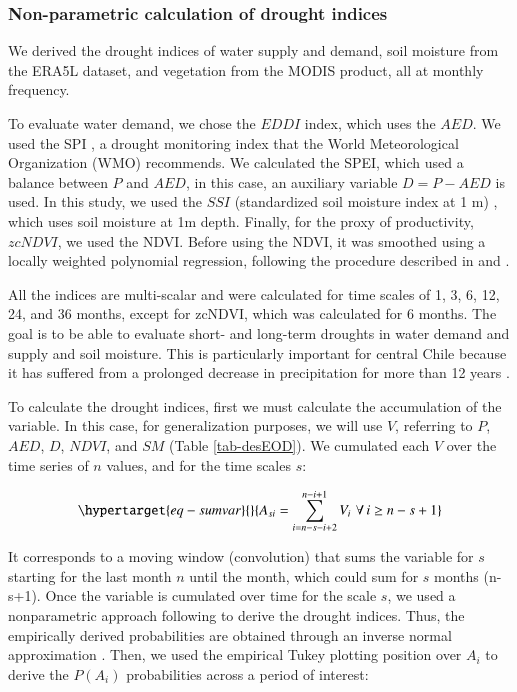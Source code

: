 \documentclass[
  authoryear,
  preprint,
  3p,
  onecolumn]{elsarticle}
\begin{document}
\hypertarget{non-parametric-calculation-of-drought-indices}{%
\subsubsection{Non-parametric calculation of drought
indices}\label{non-parametric-calculation-of-drought-indices}}

We derived the drought indices of water supply and demand, soil moisture
from the ERA5L dataset, and vegetation from the MODIS product, all at
monthly frequency.

To evaluate water demand, we chose the \(EDDI\)
\citep{Hobbins2016, McEvoy2016} index, which uses the \(AED\). We used
the SPI \citep{Mckee1993}, a drought monitoring index that the World
Meteorological Organization (WMO) recommends. We calculated the SPEI,
which used a balance between \(P\) and \(AED\), in this case, an
auxiliary variable \(D = P-AED\) is used. In this study, we used the
\(SSI\) (standardized soil moisture index at 1 m)
\citep{Hao2013, AghaKouchak2014}, which uses soil moisture at 1m depth.
Finally, for the proxy of productivity, \(zcNDVI\), we used the NDVI.
Before using the NDVI, it was smoothed using a locally weighted
polynomial regression, following the procedure described in
\citet{Zambrano2018} and \citet{Zambrano2016}.

All the indices are multi-scalar and were calculated for time scales of
1, 3, 6, 12, 24, and 36 months, except for zcNDVI, which was calculated
for 6 months. The goal is to be able to evaluate short- and long-term
droughts in water demand and supply and soil moisture. This is
particularly important for central Chile because it has suffered from a
prolonged decrease in precipitation for more than 12 years
\citep{Garreaud2020, Boisier2018, Garreaud2017}.

To calculate the drought indices, first we must calculate the
accumulation of the variable. In this case, for generalization purposes,
we will use \(V\), referring to \(P\), \(AED\), \(D\), \(NDVI\), and
\(SM\) (Table \ref{tab-desEOD}). We cumulated each \(V\) over the time
series of \(n\) values, and for the time scales \(s\):

\begin{equation}\protect\hypertarget{eq-sumvar}{}{A_{si} = \sum_{i=n-s-i+2}^{n-i+1} V_i\,\, \forall\, i\geq n-s+1  }\label{eq-sumvar}\end{equation}

It corresponds to a moving window (convolution) that sums the variable
for \(s\) starting for the last month \(n\) until the month, which could
sum for \(s\) months (n-s+1). Once the variable is cumulated over time
for the scale \(s\), we used a nonparametric approach following
\citet{Hobbins2016} to derive the drought indices. Thus, the empirically
derived probabilities are obtained through an inverse normal
approximation \citep{Abramowitz1968}. Then, we used the empirical Tukey
plotting position \citep{Wilks2011} over \(A_i\) to derive the
\(P(A_i)\) probabilities across a period of interest:
\end{document}
